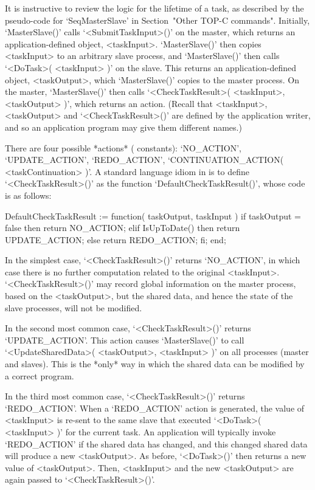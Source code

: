 It is instructive to review the logic for the  lifetime  of  a  task,  as
described by the pseudo-code for `SeqMasterSlave' in Section~"Other TOP-C
commands". Initially, `MasterSlave()' calls `<SubmitTaskInput>()' on  the
master, which returns an application-defined {\GAP} object,  <taskInput>.
`MasterSlave()' then copies <taskInput> to an  arbitrary  slave  process,
and `MasterSlave()' then calls `<DoTask>( <taskInput> )'  on  the  slave.
This returns an application-defined {\GAP}  object,  <taskOutput>,  which
`MasterSlave()'  copies  to  the   master   process.   On   the   master,
`MasterSlave()' then calls `<CheckTaskResult>( <taskInput>,  <taskOutput>
)', which returns an action. (Recall that <taskInput>,  <taskOutput>  and
`<CheckTaskResult>()' are defined by the application writer,  and  so  an
application program may give them different names.)

There are four possible  *actions*  ({\ParGAP}  constants):  `NO_ACTION',
`UPDATE_ACTION', `REDO_ACTION', `CONTINUATION_ACTION(  <taskContinuation>
)'.   A   standard   language   idiom   in   {\ParGAP}   is   to   define
`<CheckTaskResult>()'       as       the        {\ParGAP}        function
`DefaultCheckTaskResult()', whose code is as follows:

\begintt
DefaultCheckTaskResult := function( taskOutput, taskInput )
  if taskOutput = false then return NO_ACTION;
  elif IsUpToDate() then return UPDATE_ACTION;
  else return REDO_ACTION;
  fi;
end;
\endtt

In the simplest case, `<CheckTaskResult>()' returns `NO_ACTION', in which
case there is no further computation related to the original <taskInput>.
`<CheckTaskResult>()'  may  record  global  information  on  the   master
process, based on the <taskOutput>, but the shared data,  and  hence  the
state of the slave processes, will not be modified.

In  the  second   most   common   case,   `<CheckTaskResult>()'   returns
`UPDATE_ACTION'.   This   action   causes   `MasterSlave()'    to    call
`<UpdateSharedData>(  <taskOutput>,  <taskInput>  )'  on  all   processes
(master and slaves). This is the *only* way in which the shared data  can
be modified by a correct {\ParGAP} program.

In the third most common case, `<CheckTaskResult>()' returns `REDO_ACTION'.
When a `REDO_ACTION' action is generated, the  value  of  <taskInput>  is
re-sent to the same slave that executed `<DoTask>( <taskInput> )' for the
current task. An application will typically invoke `REDO_ACTION'  if  the
shared data has changed, and this changed shared data will produce a  new
<taskOutput>. As  before,  `<DoTask>()'  then  returns  a  new  value  of
<taskOutput>. Then, <taskInput> and the new <taskOutput> are again passed
to `<CheckTaskResult>()'.

